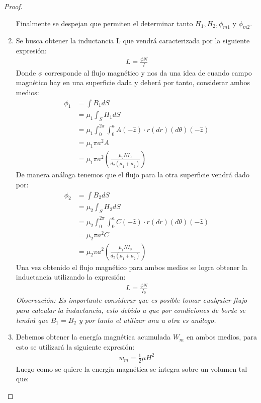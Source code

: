 \begin{proof}
\begin{enumerate}
    Finalmente se despejan que permiten el determinar tanto $H_{1} , H_{2},\phi_{m1}$  y $\phi_{m2} $.
    \item Se busca obtener la inductancia L que vendrá caracterizada por la siguiente expresión: 
    \begin{align}
        L = \frac{\phi N}{I}
    \end{align}
    Donde $\phi$ corresponde al flujo magnético y nos da una idea de cuando campo magnético hay en una superficie dada y deberá por tanto, considerar ambos medios:
    \begin{align}
        \phi_{1} &= \int B_{1} dS\\
                 &= \mu_{1} \int_{S} H_{1} dS\\
                 &= \mu_{1} \int_{0}^{2\pi} \int_{0}^{a} A (-\hat{z}) \cdot r (dr) (d\theta) (-\hat{z})  \\
                 &= \mu_{1}  \pi a^{2} A\\
                 &= \mu_{1}\pi a^{2} \left(\frac{\mu_{2} N I_{0}}{d_{2}(\mu_{1} + \mu_{2})}\right)
      \end{align}
    De manera análoga tenemos que el flujo para la otra superficie vendrá dado por:
    \begin{align}
        \phi_{2} &= \int B_{2} dS\\
                 &= \mu_{2} \int_{S} H_{2} dS\\
                 &= \mu_{2} \int_{0}^{2\pi} \int_{0}^{a} C (-\hat{z}) \cdot r (dr) (d\theta) (-\hat{z})  \\
                 &= \mu_{2}  \pi a^{2} C\\
                 &= \mu_{2}\pi a^{2} \left(\frac{\mu_{1} N I_{0}}{d_{2}(\mu_{1} + \mu_{2})}\right)
      \end{align}
    Una vez obtenido el flujo magnético para ambos medios se logra obtener la inductancia utilizando la expresión:
    \begin{align}
        L = \frac{\phi N}{I_{0}}
    \end{align}
    \textit{Observación: Es importante considerar que es posible tomar cualquier flujo para calcular la inductancia, esto debido a que por condiciones de borde se tendrá que $B_{1} = B_{2}$ y por tanto el utilizar una u otra es análogo.}
    \item Debemos obtener la energía magnética acumulada $W_{m}$ en ambos medios, para esto se utilizará la siguiente expresión:
    \begin{align}
        w_{m} = \frac{1}{2} \mu H^{2}
    \end{align}
    Luego como se quiere la energía magnética se integra sobre un volumen tal que:\\

\end{enumerate}
\end{proof}
